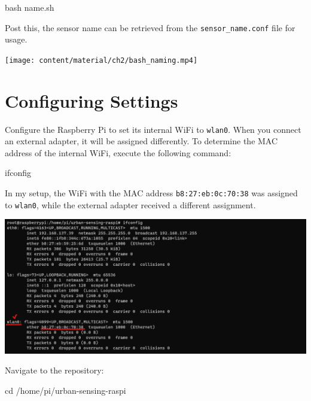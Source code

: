 \documentclass[
  letterpaper,
]{scrbook}
\newenvironment{Shaded}{\begin{snugshade}}{\end{snugshade}}
\newcommand{\BuiltInTok}[1]{\textcolor[rgb]{0.00,0.23,0.31}{#1}}
\newcommand{\ExtensionTok}[1]{\textcolor[rgb]{0.00,0.23,0.31}{#1}}
\newcommand{\FunctionTok}[1]{\textcolor[rgb]{0.28,0.35,0.67}{#1}}
\newcommand{\NormalTok}[1]{\textcolor[rgb]{0.00,0.23,0.31}{#1}}
\begin{document}
\begin{Shaded}
\begin{Highlighting}[]
\FunctionTok{bash}\NormalTok{ name.sh}
\end{Highlighting}
\end{Shaded}

Post this, the sensor name can be retrieved from the
\texttt{sensor\_name.conf} file for usage.

\texttt{[image: content/material/ch2/bash\_naming.mp4]}

\section{Configuring Settings}\label{configuring-settings}

Configure the Raspberry Pi to set its internal WiFi to \texttt{wlan0}.
When you connect an external adapter, it will be assigned differently.
To determine the MAC address of the internal WiFi, execute the following
command:

\begin{Shaded}
\begin{Highlighting}[]
\ExtensionTok{ifconfig}
\end{Highlighting}
\end{Shaded}

In my setup, the WiFi with the MAC address \texttt{b8:27:eb:0c:70:38}
was assigned to \texttt{wlan0}, while the external adapter received a
different assignment.

\includegraphics{content/material/ch2/ifconfig_wlan0.png}

Navigate to the repository:

\begin{Shaded}
\begin{Highlighting}[]
\BuiltInTok{cd}\NormalTok{ /home/pi/urban{-}sensing{-}raspi}
\end{Highlighting}
\end{Shaded}
\end{document}
